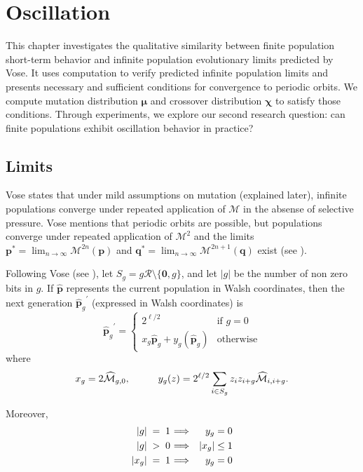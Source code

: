 \chapter{Oscillation} \label{ch:oscillation}
This chapter investigates the qualitative similarity between finite population 
short-term behavior and infinite population evolutionary limits predicted by Vose. 
It uses computation to verify predicted infinite population limits and presents 
necessary and sufficient conditions for convergence to periodic orbits. 
We compute mutation distribution $\bm{\mu}$ and crossover distribution $\bm{\chi}$ 
to satisfy those conditions. Through experiments, we explore our second research 
question: can finite populations exhibit oscillation behavior in practice?

\section{Limits}
\label{Limits}
Vose states that under mild assumptions on mutation (explained later), infinite populations converge under repeated application 
of $\mathcal{M}$ in the absense of selective pressure. Vose mentions that periodic orbits are possible, but populations converge under 
repeated application of $\mathcal{M}^2$ and the limits $\bm{p}^\ast = \lim_{n \rightarrow \infty} \mathcal{M}^{2n}({\bm p})$ 
and ${\bm q}^\ast = \lim_{n \rightarrow \infty} \mathcal{M}^{2n+1}({\bm q})$ exist (see \cite{Vose1999}).

Following Vose (see \cite{Vose1999}), let $S_g = g \mathcal{R} \setminus \{\textbf{0}, g\}$, and let $|g|$ be the number of non zero bits in $g$. 
If $\widehat{\bm{p}}$ represents the current population in Walsh coordinates, then the next generation ${\widehat{\bm{p}}_g}^{\prime}$ 
(expressed in Walsh coordinates) is 
\[
{{\widehat{\bm{p}}}_g}^{\prime}  = \begin{cases}
    2^{\ell /2}  & \text{if $g = 0$}\\
    x_g \widehat{{\bm p}}_g + y_g(\widehat{{\bm p}}_g) & \text{otherwise}
  \end{cases}
\]
where
\[
x_g = 2\widehat{\mathcal{M}}_{g,0},  \hspace*{1cm} y_g(z) = 2^{\ell /2} \sum_{i \in S_g} z_i z_{i+g} \widehat{\mathcal{M}}_{i,i+g}.
\]

Moreover, 
\begin{eqnarray*}
|g| \;=\; 1 \hspace{0.01in} & \Longrightarrow & y_g = 0 \\
|g| \;>\; 0 \hspace{0.01in} & \Longrightarrow & |x_g| \leq 1 \\
|x_g| \;=\; 1 \hspace{0.01in} & \Longrightarrow & y_g = 0
\end{eqnarray*}

